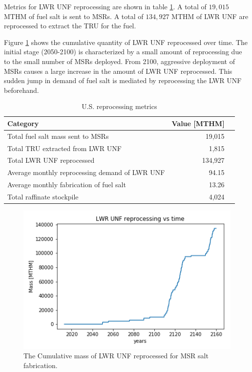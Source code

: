 Metrics for \gls{LWR} \gls{UNF} reprocessing
are shown in table \ref{tab:us_rep}. A total of
$19,015$ MTHM of fuel salt is sent to \glspl{MSR}.
A total of $134,927$ MTHM of \gls{LWR} \gls{UNF}
are reprocessed to extract the \gls{TRU} for the fuel.

Figure \ref{fig:lwr_unf_reproc} shows the cumulative quantity of \gls{LWR}
\gls{UNF} reprocessed over time. The initial stage (2050-2100) is characterized
by a small amount of reprocessing due to the small number of \glspl{MSR} deployed.
From 2100, aggressive deployment of \glspl{MSR} causes
a large increase in the amount of \gls{LWR} \gls{UNF} reprocessed. This sudden
jump in demand of fuel salt is mediated by reprocessing the \gls{LWR} \gls{UNF} beforehand.

\begin{table}[h]
	\centering
	\caption{U.S. reprocessing metrics}
	\begin{tabular}{lrl}
		\hline
		\textbf{Category} & \textbf{Value [MTHM]} \\
		\hline
		Total fuel salt mass sent to \gls{MSR}s & 19,015 \\
		Total TRU extracted from \gls{LWR} \gls{UNF} & 1,815 \\
		Total \gls{LWR} \gls{UNF} reprocessed & 134,927 \\
		Average monthly reprocessing demand of \gls{LWR} \gls{UNF} & 94.15 \\
		Average monthly fabrication of fuel salt & 13.26 \\
		Total raffinate stockpile & 4,024 \\
		\hline
	\end{tabular}
	\label{tab:us_rep}
\end{table}


\begin{figure}[htbp!]
	\begin{center}
		\includegraphics[scale=0.7]{./images/us/lwr_unf_reproc.png}
	\end{center}
	\caption{The Cumulative mass of \gls{LWR} \gls{UNF} reprocessed for \gls{MSR} salt fabrication.}
	\label{fig:lwr_unf_reproc}
\end{figure}

